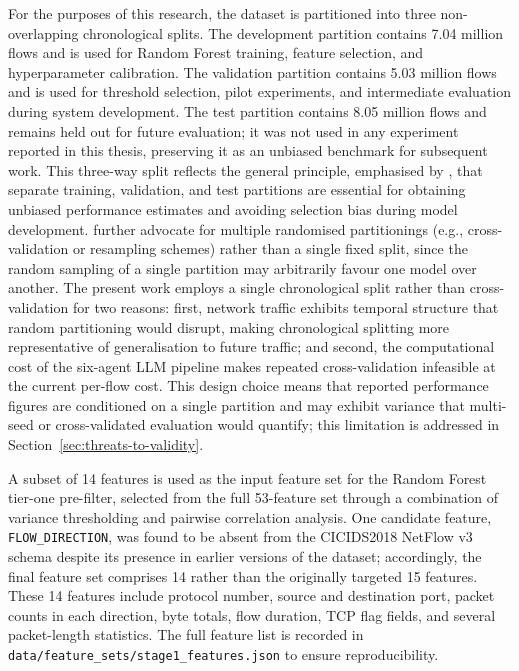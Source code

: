 \documentclass[../main.tex]{subfiles}
\begin{document}
For the purposes of this research, the dataset is partitioned into three non-overlapping chronological splits. The development partition contains 7.04 million flows and is used for Random Forest training, feature selection, and hyperparameter calibration. The validation partition contains 5.03 million flows and is used for threshold selection, pilot experiments, and intermediate evaluation during system development. The test partition contains 8.05 million flows and remains held out for future evaluation; it was not used in any experiment reported in this thesis, preserving it as an unbiased benchmark for subsequent work. This three-way split reflects the general principle, emphasised by \textcite{Cawley2010}, that separate training, validation, and test partitions are essential for obtaining unbiased performance estimates and avoiding selection bias during model development. \textcite{Cawley2010} further advocate for multiple randomised partitionings (e.g., cross-validation or resampling schemes) rather than a single fixed split, since the random sampling of a single partition may arbitrarily favour one model over another. The present work employs a single chronological split rather than cross-validation for two reasons: first, network traffic exhibits temporal structure that random partitioning would disrupt, making chronological splitting more representative of generalisation to future traffic; and second, the computational cost of the six-agent LLM pipeline makes repeated cross-validation infeasible at the current per-flow cost. This design choice means that reported performance figures are conditioned on a single partition and may exhibit variance that multi-seed or cross-validated evaluation would quantify; this limitation is addressed in Section~\ref{sec:threats-to-validity}.

A subset of 14 features is used as the input feature set for the Random Forest tier-one pre-filter, selected from the full 53-feature set through a combination of variance thresholding and pairwise correlation analysis. One candidate feature, \texttt{FLOW\_DIRECTION}, was found to be absent from the CICIDS2018 NetFlow v3 schema despite its presence in earlier versions of the dataset; accordingly, the final feature set comprises 14 rather than the originally targeted 15 features. These 14 features include protocol number, source and destination port, packet counts in each direction, byte totals, flow duration, TCP flag fields, and several packet-length statistics. The full feature list is recorded in \texttt{data/feature\_sets/stage1\_features.json} to ensure reproducibility.
\end{document}
